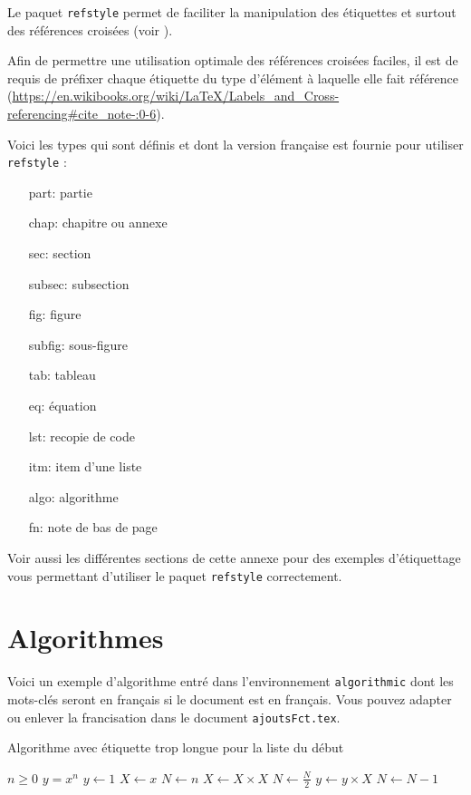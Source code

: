 Le paquet \texttt{refstyle} permet de faciliter la manipulation des étiquettes et surtout des références croisées (voir ). 

Afin de permettre une utilisation optimale des références croisées faciles, il est de requis de préfixer chaque étiquette du type d'élément à laquelle elle fait référence (\url{https://en.wikibooks.org/wiki/LaTeX/Labels_and_Cross-referencing#cite_note-:0-6}).

Voici les types qui sont définis et dont la version française est fournie pour utiliser \texttt{refstyle} :

\begin{itemize}
	\item[part:] partie
	\item[chap:] chapitre ou annexe
	\item[sec:]  section
	\item[subsec:] subsection
	\item[fig:] figure
	\item[subfig:] sous-figure
	\item[tab:] tableau
	\item[eq:] équation
	\item[lst:] recopie de code
	\item[itm:] item d'une liste
	\item[algo:] algorithme
	\item[fn:] note de bas de page
\end{itemize}

Voir aussi les différentes sections de cette annexe pour des exemples d'étiquettage vous permettant d'utiliser le paquet \texttt{refstyle} correctement.

\newpage

\section{Algorithmes}

Voici un exemple d'algorithme entré dans l'environnement \texttt{algorithmic} dont les mots-clés seront en français si le document est en français. Vous pouvez adapter ou enlever la francisation dans le document \texttt{ajoutsFct.tex}.

\begin{algorithm}[H]
	\caption[Titre court]{Algorithme avec étiquette trop longue pour la liste du début}\label{algo:cap}
	\begin{algorithmic}
		\Require $n \geq 0$
		\Ensure $y = x^n$
		\State $y \gets 1$
		\State $X \gets x$
		\State $N \gets n$
		\State $X \gets X \times X$
		\State $N \gets \frac{N}{2}$  
		\State $y \gets y \times X$
		\State $N \gets N - 1$
		\EndIf
		\EndWhile
	\end{algorithmic}
\end{algorithm}

